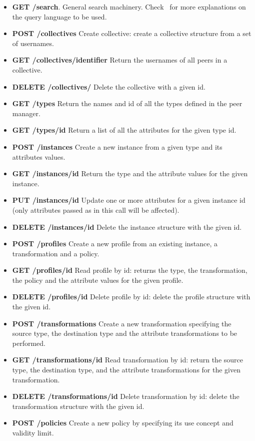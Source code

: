\begin{itemize}
\item {\bf GET /search}. General search machinery. Check~\cite{D4.3} for more explanations on the query language to be used. 	
\item {\bf POST /collectives} Create collective: create a collective structure from a set of usernames.
\item {\bf GET /collectives/identifier}	Return the usernames of all peers in a collective.				
\item {\bf DELETE /collectives/} Delete the collective with a given id.	
\item {\bf GET /types} Return the names and id of all the types defined in the peer manager.
\item {\bf GET /types/id} Return a list of all the attributes for the given type id.
\item {\bf POST /instances} Create a new instance from a given type and its attributes values. 
\item {\bf GET /instances/id} Return the type and the attribute values for the given instance.
\item {\bf PUT /instances/id} Update one or more attributes for a given instance id (only attributes passed as in this call will be affected).											
\item {\bf DELETE /instances/id } Delete the instance structure with the given id.						
\item {\bf POST /profiles} Create a new profile from an existing instance, a transformation and a policy.
\item {\bf GET /profiles/id} Read profile by id: returns the type, the transformation, the policy and the attribute values for the given profile. 
\item {\bf DELETE /profiles/id} Delete profile by id: delete the profile structure with the given id.	
\item {\bf POST /transformations}  Create a new transformation specifying the source type, the destination type and the attribute transformations to be performed.
\item {\bf GET /transformations/id} Read transformation by id: return the source type, the destination type, and the attribute transformations for the given transformation.									
\item {\bf DELETE /transformations/id} Delete transformation by id: delete the transformation structure with the given id.	
\item {\bf POST /policies} Create a new policy by specifying its use concept and validity limit.		

\end{itemize}
